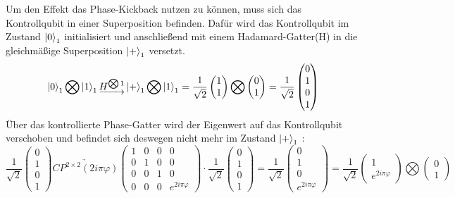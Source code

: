 Um den Effekt das Phase-Kickback nutzen zu können, muss sich das Kontrollqubit in einer Superposition befinden.
Dafür wird das Kontrollqubit im Zustand \(\ket{0}_1\) initialisiert und
anschließend mit einem Hadamard-Gatter(H) in die gleichmäßige Superposition \(\ket{+}_1\) versetzt.
\[\ket{0}_1 \bigotimes \ket{1}_1 
\underrightarrow{H^{\bigotimes 1}}
 \ket{+}_1 \bigotimes \ket{1}_1
=
\frac{1}{\sqrt{2}}
\begin{pmatrix}
  1 \\
  1
 \end{pmatrix}
 \bigotimes
 \begin{pmatrix}
  0 \\
  1 
 \end{pmatrix}
 =
 \frac{1}{\sqrt{2}}
 \begin{pmatrix}
  0 \\
  1 \\
  0 \\
  1
\end{pmatrix}
 \]
Über das kontrollierte Phase-Gatter wird der Eigenwert auf das Kontrollqubit verschoben und
befindet sich deswegen nicht mehr im Zustand \(\ket{+}_1\) :
\[
  \frac{1}{\sqrt{2}}
  \begin{pmatrix}
   0 \\
   1 \\
   0 \\
   1
  \end{pmatrix}
  \underrightarrow{CP^{2\times 2}(2 i \pi \varphi)}
  \begin{pmatrix}
    1 & 0 & 0 & 0\\
    0 & 1 & 0 & 0\\
    0 & 0 & 1 & 0\\
    0 & 0 & 0 & e^{2 i \pi \varphi}
  \end{pmatrix}
  \cdot
  \frac{1}{\sqrt{2}}
  \begin{pmatrix}
   0 \\
   1 \\
   0 \\
   1
  \end{pmatrix}
  =
  \frac{1}{\sqrt{2}}
  \begin{pmatrix}
    0 \\
    1 \\
    0 \\
    e^{2 i \pi \varphi}
  \end{pmatrix}
  =
  \frac{1}{\sqrt{2}}
  \begin{pmatrix}
    1 \\
    e^{2 i \pi \varphi}
   \end{pmatrix}
   \bigotimes
   \begin{pmatrix}
    0 \\
    1 
   \end{pmatrix}
  \]

